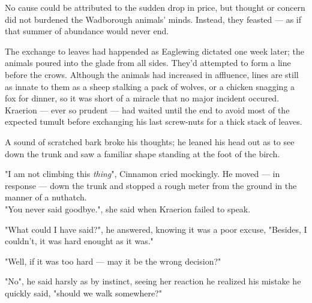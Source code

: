 No cause could be attributed to the sudden drop in price, but thought or concern did not burdened the Wadborough animals' minds. Instead, they feasted — as if that summer of abundance would never end. 

The exchange to leaves had happended as Eaglewing dictated one week later; the animals poured into the glade from all sides. They'd attempted to form a line before the crows. Although the animals had increased in affluence, lines are still as innate to them as a sheep stalking a pack of wolves, or a chicken snagging a fox for dinner, so it was short of a miracle that no major incident occured. Kraerion — ever so prudent — had waited until the end to avoid most of the expected tumult before exchanging his last screw-nuts for a thick stack of leaves. 


A sound of scratched bark broke his thoughts; he leaned his head out as to see down the trunk and saw a familiar shape standing at the foot of the birch. 

"I am not climbing this \textit{thing}", Cinnamon cried mockingly. He moved — in response — down the trunk and stopped a rough meter from the ground in the manner of a nuthatch.\\

"You never said goodbye.", she said when Kraerion failed to speak.

"What could I have said?", he answered, knowing it was a poor excuse, "Besides, I couldn't, it was hard enought as it was."

"Well, if it was too hard — may it be the wrong decision?"

"No", he said harsly as by instinct, seeing her reaction he realized his mistake he quickly said, "should we walk somewhere?"

